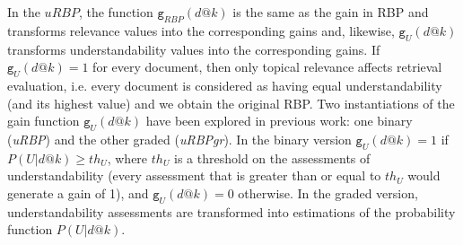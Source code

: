 In the $uRBP$, the function $\mathtt{g}_{RBP}(d@k)$ is the same as the gain in RBP and transforms relevance values into the corresponding gains and, likewise, $\mathtt{g}_{U}(d@k)$ transforms understandability values into the corresponding gains. 
If $\mathtt{g}_{U}(d@k)=1$ for every document, then only topical relevance affects retrieval evaluation, i.e. every document is considered as having equal understandability (and its highest value) and we obtain the original RBP. Two instantiations of the gain function $\mathtt{g}_{U}(d@k)$ have been explored in previous work: one binary (\textit{uRBP}) and the other graded (\textit{uRBPgr}). In the binary version $\mathtt{g}_{U}(d@k) = 1$ if $P(U|d@k) \geq th_U$, where $th_U$ is a threshold on the assessments of understandability (every assessment that is greater than or equal to $th_U$ would generate a gain of 1), and $\mathtt{g}_{U}(d@k)=0$ otherwise. In the graded version, understandability assessments are transformed into estimations of the probability function $P(U|d@k)$.


